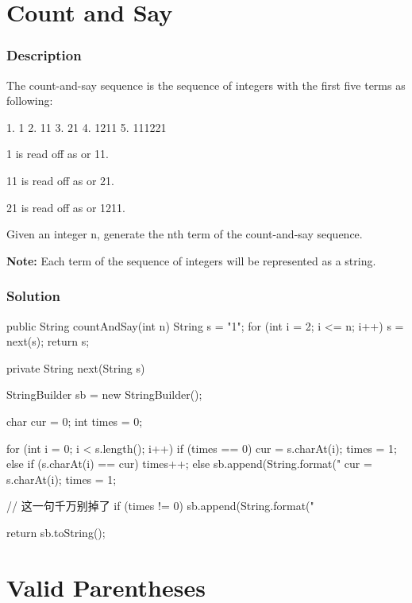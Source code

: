 \newpage

\section{Count and Say} %

\subsubsection{Description}
The count-and-say sequence is the sequence of integers with the first five terms as following:
\begin{Code}
1.     1
2.     11
3.     21
4.     1211
5.     111221
\end{Code}
1 is read off as  or 11.

11 is read off as  or 21.

21 is read off as  or 1211.

Given an integer n, generate the nth term of the count-and-say sequence.

\textbf{Note:} Each term of the sequence of integers will be represented as a string.
\subsubsection{Solution}

\begin{Code}
public String countAndSay(int n) {
    String s = "1";
    for (int i = 2; i <= n; i++) {
        s = next(s);
    }
    return s;
}

private String next(String s) {
    StringBuilder sb = new StringBuilder();

    char cur = 0;
    int times = 0;

    for (int i = 0; i < s.length(); i++) {
        if (times == 0) {
            cur = s.charAt(i);
            times = 1;
        } else if (s.charAt(i) == cur) {
            times++;
        } else {
            sb.append(String.format("%
            cur = s.charAt(i);
            times = 1;
        }
    }

    // 这一句千万别掉了
    if (times != 0) {
        sb.append(String.format("%
    }

    return sb.toString();
}
\end{Code}

\newpage

\section{Valid Parentheses} %

